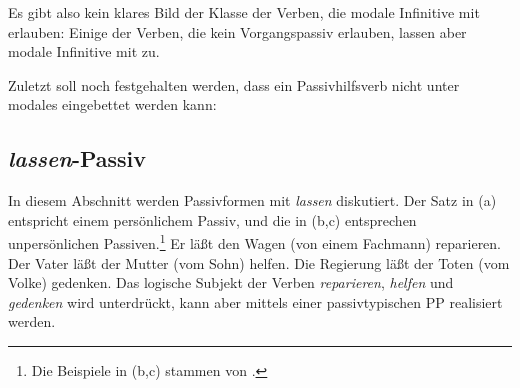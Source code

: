 Es gibt also kein klares Bild der Klasse der Verben, die modale Infinitive mit \sein erlauben:
Einige der Verben, die kein Vorgangspassiv erlauben, lassen aber modale Infinitive mit \sein
zu.%

Zuletzt soll noch festgehalten werden, dass ein Passivhilfsverb nicht unter modales \sein
eingebettet werden kann:
\z
%
%


\subsection{\emph{lassen}-Passiv}

In diesem Abschnitt werden Passivformen mit \emph{lassen} diskutiert.
Der Satz in (a) entspricht einem persönlichem Passiv, und
die in (b,c) entsprechen unpersönlichen Passiven.\footnote{
        Die Beispiele in (b,c) stammen von \citet[]{Reis76c}.
}
\eal
\label{bsp-lassen-passiv}
\ex{}
Er       läßt den Wagen     (von einem Fachmann) reparieren.
\ex{}
Der Vater        läßt der Mutter       (vom Sohn) helfen.
\ex{}
Die Regierung        läßt der Toten      (vom Volke) gedenken.
\zl
Das logische Subjekt der Verben \emph{reparieren}, \emph{helfen} und 
\emph{gedenken} wird unterdrückt, kann aber mittels einer passivtypischen
PP realisiert werden.

